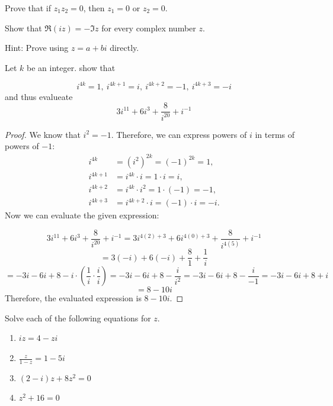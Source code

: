 \documentclass[
	12pt, %
	fleqn, %
	a4paper, %
]{LegrandOrangeBook}
\begin{document}
\begin{exercise}
    Prove that if $z_1z_2=0$, then $z_1=0$ or $z_2=0$.
\end{exercise}

\begin{exercise}
    Show that \(\Re(i z) = -\Im z\) for every complex number \(z\).
\end{exercise}
Hint: Prove using $z=a+bi$ directly.

\begin{exercise}
    Let $\displaystyle k$ be an integer. show that

\begin{equation*}
i^{4k} =1,\ i^{4k+1} =i,\ i^{4k+2} =-1,\ i^{4k+3} =-i
\end{equation*}
and thus evalueate
\begin{equation*}
3i^{11} +6i^{3} +\frac{8}{i^{20}} +i^{-1}
\end{equation*}
\end{exercise}
\begin{proof}
    We know that \( i^2 = -1 \). Therefore, we can express powers of \( i \) in terms of powers of \( -1 \):
\begin{align*}
i^{4k} &= (i^2)^{2k} = (-1)^{2k} = 1, \\
i^{4k+1} &= i^{4k} \cdot i = 1 \cdot i = i, \\
i^{4k+2} &= i^{4k} \cdot i^2 = 1 \cdot (-1) = -1, \\
i^{4k+3} &= i^{4k+2} \cdot i = (-1) \cdot i = -i.
\end{align*}
Now we can evaluate the given expression:

\[
3i^{11} + 6i^3 + \frac{8}{i^{20}} + i^{-1} = 3i^{4(2)+3} + 6i^{4(0)+3} + \frac{8}{i^{4(5)}} + i^{-1}
\]
\[
= 3(-i) + 6(-i) + \frac{8}{1} + \frac{1}{i}
\]
\[
= -3i - 6i + 8 - i \cdot \left( \frac{1}{i} \cdot \frac{i}{i} \right) = -3i - 6i + 8 - \frac{i}{i^2} = -3i - 6i + 8 - \frac{i}{-1} = -3i - 6i + 8 + i
\]
\[
= 8 - 10i
\]
Therefore, the evaluated expression is \( 8 - 10i \).
\end{proof}

\begin{exercise}
    Solve each of the following equations for \( z \).
    \begin{enumerate}[label=(\alph*)]
        \item \( iz = 4 - zi \)
        \item \( \frac{z}{1 - z} = 1 - 5i \)
        \item \( (2 - i)z + 8z^2 = 0 \)
        \item \( z^2 + 16 = 0 \)
    \end{enumerate}
\end{exercise}
\end{document}

